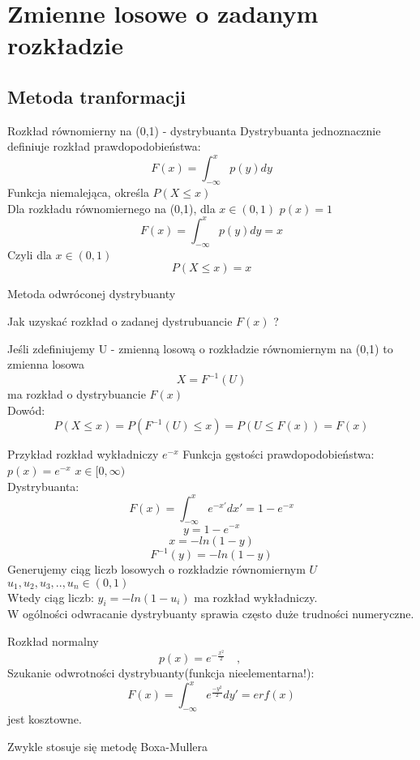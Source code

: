 \section{Zmienne losowe o zadanym rozkładzie}
\subsection{Metoda  tranformacji}
\begin{frame}{Rozkład równomierny na (0,1) - dystrybuanta}
    Dystrybuanta jednoznacznie definiuje rozkład prawdopodobieństwa:
$$
F(x)=\int_{-\infty}^{x}{p(y)dy}
$$
Funkcja niemalejąca, określa  $P(X\le x)$\\
Dla rozkładu równomiernego na (0,1), dla
$x\in (0,1)$ $p(x)=1$
$$
F(x)=\int_{-\infty}^{x}{p(y)dy}=x
$$
Czyli dla $x \in (0,1)$
$$P(X\le x)=x$$
\end{frame}
\begin{frame}{Metoda odwróconej dystrybuanty}


Jak uzyskać rozkład o zadanej dystrubuancie $F(x)$ ?

Jeśli zdefiniujemy U - zmienną losową o rozkładzie równomiernym na (0,1) to zmienna losowa
$$
X=F^{-1}(U)
$$
ma rozkład o dystrybuancie $F(x)$\\

Dowód:
$$
P(X\le x)= P(F^{-1}(U)\le x
)=P(U \le F(x))=F(x)
$$

\end{frame}
\begin{frame}{Przykład rozkład wykładniczy $e^{-x}$}
Funkcja gęstości prawdopodobieństwa:    
    $p(x)=e^{-x}$ $x \in [0,\infty)$\\
    
Dystrybuanta:
$$
F(x)=\int_{-\infty}^x{e^{-x'}dx'}=1-e^{-x}
$$
$$
y=1-e^{-x}
$$
$$
x=-ln(1-y)
$$
$$
F^{-1}(y)=-ln(1-y)
$$
Generujemy ciąg liczb losowych o rozkładzie równomiernym $U$ $u_1, u_2, u_3, .., u_n \in (0,1)$\\
Wtedy ciąg liczb:
$y_i=-ln(1-u_i)$
ma rozkład wykładniczy.\\
W ogólności odwracanie dystrybuanty sprawia często duże trudności numeryczne. 
\end{frame}
\begin{frame}{Rozkład normalny}
    $$p(x) = e^{-\frac{x^{2}}{2}} \quad, \qquad$$
    Szukanie odwrotności dystrybuanty(funkcja nieelementarna!):
    $$F(x)=\int_{-\infty}^{x}e^{\frac{-y^2}{2}}dy'=erf(x) $$
    jest kosztowne.
    
    Zwykle stosuje się metodę Boxa-Mullera 
\end{frame}

